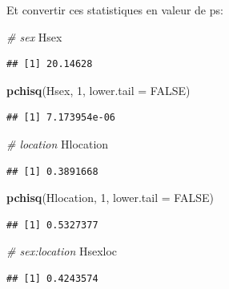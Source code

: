 \documentclass[12pt,]{book}
\newenvironment{Shaded}{\begin{snugshade}}{\end{snugshade}}
\newcommand{\CommentTok}[1]{\textcolor[rgb]{0.56,0.35,0.01}{\textit{#1}}}
\newcommand{\DataTypeTok}[1]{\textcolor[rgb]{0.13,0.29,0.53}{#1}}
\newcommand{\DecValTok}[1]{\textcolor[rgb]{0.00,0.00,0.81}{#1}}
\newcommand{\KeywordTok}[1]{\textcolor[rgb]{0.13,0.29,0.53}{\textbf{#1}}}
\newcommand{\NormalTok}[1]{#1}
\newcommand{\OtherTok}[1]{\textcolor[rgb]{0.56,0.35,0.01}{#1}}
\begin{document}
Et convertir ces statistiques en valeur de ps:

\begin{Shaded}
\begin{Highlighting}[]
\CommentTok{# sex}
\NormalTok{Hsex}
\end{Highlighting}
\end{Shaded}

\begin{verbatim}
## [1] 20.14628
\end{verbatim}

\begin{Shaded}
\begin{Highlighting}[]
\KeywordTok{pchisq}\NormalTok{(Hsex, }\DecValTok{1}\NormalTok{, }\DataTypeTok{lower.tail =} \OtherTok{FALSE}\NormalTok{)}
\end{Highlighting}
\end{Shaded}

\begin{verbatim}
## [1] 7.173954e-06
\end{verbatim}

\begin{Shaded}
\begin{Highlighting}[]
\CommentTok{# location}
\NormalTok{Hlocation}
\end{Highlighting}
\end{Shaded}

\begin{verbatim}
## [1] 0.3891668
\end{verbatim}

\begin{Shaded}
\begin{Highlighting}[]
\KeywordTok{pchisq}\NormalTok{(Hlocation, }\DecValTok{1}\NormalTok{, }\DataTypeTok{lower.tail =} \OtherTok{FALSE}\NormalTok{)}
\end{Highlighting}
\end{Shaded}

\begin{verbatim}
## [1] 0.5327377
\end{verbatim}

\begin{Shaded}
\begin{Highlighting}[]
\CommentTok{# sex:location}
\NormalTok{Hsexloc}
\end{Highlighting}
\end{Shaded}

\begin{verbatim}
## [1] 0.4243574
\end{verbatim}
\end{document}
